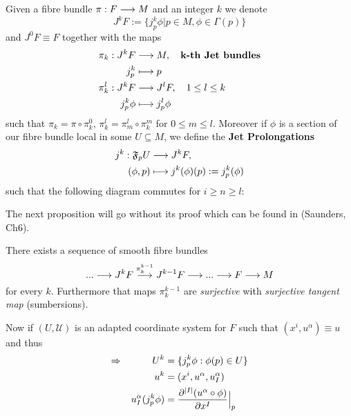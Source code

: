 \begin{definition}
  Given a fibre bundle $\pi: F\longrightarrow M$ and an integer $k$ we denote
  $$ J^k F := \{j^k_p \phi | p \in M, \phi \in \Gamma(p) \}$$
  and $J^0 F \equiv F$ together with the maps
  \begin{align*}
    \pi_k : J^k F &\lra M, \quad \textbf{k-th Jet bundles}\\
    j^k_p &\lmap p \\
    \pi^l_k: J^kF &\lra J^l F, \quad 1 \leq l \leq k \\
    j^k_p  \phi &\lmap j^l_p \phi
  \end{align*}
  such that $\pi_k = \pi \circ \pi^0_k$, $\pi^l_k = \pi^l_m \circ \pi^m_k$ for $0 \leq m \leq l$. Moreover if $\phi$ is a section of our fibre bundle local in some $U\subseteq M$, we define the \textbf{Jet Prolongations}
  \begin{align*}
    j^k: \mathfrak{F}_p U &\lra J^k F,\\
    (\phi, p) &\lmap j^k(\phi)(p) := j^k_p(\phi)
  \end{align*}
  such that the following diagram commutes for $i \geq n \geq l$:
  \begin{center}
  \end{center}
\end{definition}

The next proposition will go without its proof which can be found in (Saunders, Ch6). %

\begin{prop}
 There exists a sequence of smooth fibre bundles
 $$ ... \longrightarrow J^kF \overset{\pi^{k-1}_k}{\longrightarrow} J^{k-1}F \longrightarrow ... \longrightarrow F \longrightarrow M $$
 for every $k$. Furthermore that maps $\pi^{k-1}_k$ are \emph{surjective} with \emph{surjective tangent map} (sumbersions).
\end{prop}

Now if $(U, \mathcal{U})$ is an adapted coordinate system for $F$ such that $(x^i, u^\alpha) \equiv u$ and thus
\begin{align*}
  \Rightarrow \quad \quad \quad U^k &= \{j^k_p \phi : \phi(p) \in U\}\\
  u^k &= (x^i, u^\alpha, u_I^\alpha)\\
  u^\alpha_I(j^k_p \phi) &= \dell{^{|I|} (u^\alpha \circ \phi)}{x^I}\Big|_p
\end{align*}

